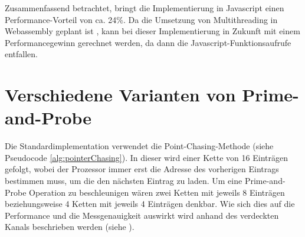 Zusammenfassend betrachtet, bringt die Implementierung in Javascript einen Performance-Vorteil von ca. 24\%.
Da die Umsetzung von Multithreading in Webassembly geplant ist \cite{WebassemblyThreads}, kann bei dieser Implementierung in Zukunft mit einem Performancegewinn gerechnet werden, da dann die Javascript-Funktionsaufrufe entfallen.

\section{Verschiedene Varianten von Prime-and-Probe}

Die Standardimplementation verwendet die Point-Chasing-Methode (siehe Pseudocode \ref{alg:pointerChasing}). 
In dieser wird einer Kette von 16 Einträgen gefolgt, wobei der Prozessor immer erst die Adresse des vorherigen Eintrags bestimmen muss, um die den nächsten Eintrag zu laden.
Um eine Prime-and-Probe Operation zu beschleunigen wären zwei Ketten mit jeweils 8 Einträgen beziehungsweise 4 Ketten mit jeweils 4 Einträgen denkbar.
Wie sich dies auf die Performance und die Messgenauigkeit auswirkt wird anhand des verdeckten Kanals beschrieben werden (siehe ).